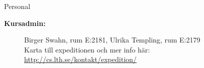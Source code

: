 \begin{SlideExtra}{Personal \CurrentYear}
\begin{description}
\item [\bfseries Kursadmin:]
Birger Swahn, rum E:2181, Ulrika Templing, rum E:2179 \\
Karta till expeditionen och mer info här: 
\url{http://cs.lth.se/kontakt/expedition/} \\
\end{description}
\end{SlideExtra}
\fi


